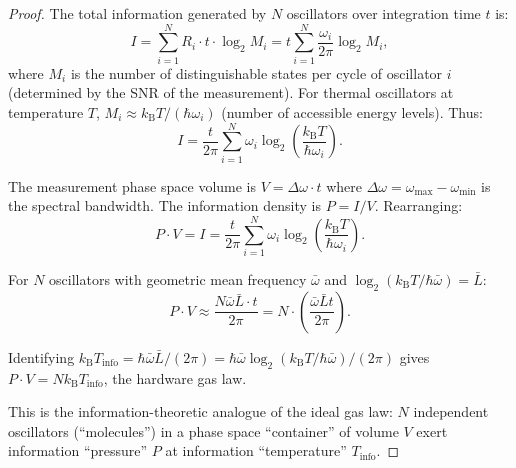 \documentclass[11pt,twocolumn,a4paper]{article}
\theoremstyle{definition}
\theoremstyle{remark}
\newcommand{\kB}{k_{\mathrm{B}}}
\begin{document}
\begin{proof}
The total information generated by $N$ oscillators over integration time $t$ is:
\begin{equation}
I = \sum_{i=1}^N R_i \cdot t \cdot \log_2 M_i = t \sum_{i=1}^N \frac{\omega_i}{2\pi} \log_2 M_i,
\end{equation}
where $M_i$ is the number of distinguishable states per cycle of oscillator $i$ (determined by the SNR of the measurement). For thermal oscillators at temperature $T$, $M_i \approx \kB T / (\hbar\omega_i)$ (number of accessible energy levels). Thus:
\begin{equation}
I = \frac{t}{2\pi} \sum_{i=1}^N \omega_i \log_2\left(\frac{\kB T}{\hbar\omega_i}\right).
\end{equation}

The measurement phase space volume is $V = \Delta\omega \cdot t$ where $\Delta\omega = \omega_{\max} - \omega_{\min}$ is the spectral bandwidth. The information density is $P = I/V$. Rearranging:
\begin{equation}
P \cdot V = I = \frac{t}{2\pi} \sum_{i=1}^N \omega_i \log_2\left(\frac{\kB T}{\hbar\omega_i}\right).
\end{equation}

For $N$ oscillators with geometric mean frequency $\bar{\omega}$ and $\log_2(\kB T/\hbar\bar{\omega}) = \bar{L}$:
\begin{equation}
P \cdot V \approx \frac{N \bar{\omega} \bar{L} \cdot t}{2\pi} = N \cdot \left(\frac{\bar{\omega} \bar{L} t}{2\pi}\right).
\end{equation}

Identifying $\kB T_{\mathrm{info}} = \hbar\bar{\omega}\bar{L}/(2\pi) = \hbar\bar{\omega}\log_2(\kB T/\hbar\bar{\omega})/(2\pi)$ gives $P \cdot V = N \kB T_{\mathrm{info}}$, the hardware gas law.

This is the information-theoretic analogue of the ideal gas law: $N$ independent oscillators (``molecules'') in a phase space ``container'' of volume $V$ exert information ``pressure'' $P$ at information ``temperature'' $T_{\mathrm{info}}$.
\end{proof}
\end{document}
